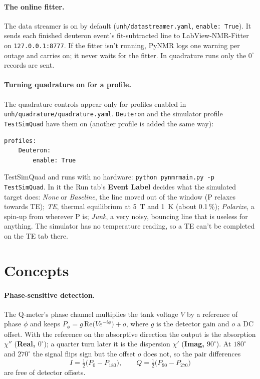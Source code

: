 \documentclass[11pt]{article}
\newcommand{\code}[1]{\texttt{\begingroup\def\_{\textunderscore\allowbreak}#1\endgroup}}
\newcommand{\btn}[1]{\textsf{\textbf{#1}}}   %
\begin{document}
\paragraph{The online fitter.} The data streamer is on by default (\code{unh/data\_streamer.yaml},
\code{enable: True}). It sends each finished deuteron event's fit-subtracted line to LabView-NMR-Fitter on
\code{127.0.0.1:8777}. If the fitter isn't running, PyNMR logs one warning per outage and carries on; it
never waits for the fitter. In quadrature runs only the $0^\circ$ records are sent.

\paragraph{Turning quadrature on for a profile.} The quadrature controls appear only for profiles enabled in
\code{unh/quadrature/quadrature.yaml}. \code{Deuteron} and the simulator profile \code{TestSimQuad} have them on
(another profile is added the same way):
\begin{verbatim}
profiles:
    Deuteron:
        enable: True
\end{verbatim}
TestSimQuad and runs with no hardware:
\code{python pynmr\_main.py -p TestSimQuad}. In it the Run tab's \btn{Event Label} decides what the simulated target
does: \emph{None} or \emph{Baseline}, the line moved out of the window (P relaxes towards TE); \emph{TE}, thermal
equilibrium at 5~T and 1~K (about 0.1\,\%); \emph{Polarize}, a spin-up from wherever P is; \emph{Junk}, a very noisy,
bouncing line that is useless for anything. The simulator has no temperature reading, so a TE can't be completed
on the TE tab there.

\section{Concepts}
\label{sec:concepts}

\paragraph{Phase-sensitive detection.} The Q-meter's phase channel multiplies the tank voltage $V$ by a
reference of phase $\phi$ and keeps $P_\phi=g\,\mathrm{Re}\!\big(V e^{-i\phi}\big)+o$, where $g$ is the
detector gain and $o$ a DC offset. With the reference on the absorptive direction the output is the
absorption $\chi''$ (\textbf{Real, $0^\circ$}); a quarter turn later it is the dispersion $\chi'$
(\textbf{Imag, $90^\circ$}). At $180^\circ$ and $270^\circ$ the signal flips sign but the offset $o$ does
not, so the pair differences
\begin{equation}
  I=\tfrac12\big(P_{0}-P_{180}\big),\qquad Q=\tfrac12\big(P_{90}-P_{270}\big)
  \label{eq:pairs}
\end{equation}
are free of detector offsets.
\end{document}
